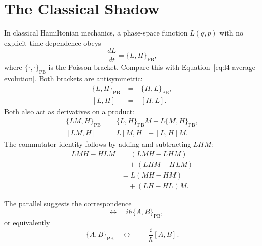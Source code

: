 \begin{classroomqa}
\end{classroomqa}

\section{The Classical Shadow}

In classical Hamiltonian mechanics, a phase-space function \(L(q,p)\) with no explicit time dependence obeys
\begin{equation}
\frac{dL}{dt}=\{L,H\}_{\mathrm{PB}},
\label{eq:l4-poisson-evolution}
\end{equation}
where \(\{\cdot,\cdot\}_{\mathrm{PB}}\) is the Poisson bracket. Compare this with Equation~\eqref{eq:l4-average-evolution}. Both brackets are antisymmetric:
\begin{align}
\{L,H\}_{\mathrm{PB}}&=-\{H,L\}_{\mathrm{PB}},\\
[L,H]&=-[H,L].
\end{align}
Both also act as derivatives on a product:
\begin{align}
\{LM,H\}_{\mathrm{PB}}
&=\{L,H\}_{\mathrm{PB}}M+L\{M,H\}_{\mathrm{PB}},\\
[LM,H]
&=L[M,H]+[L,H]M.
\label{eq:l4-commutator-product}
\end{align}
The commutator identity follows by adding and subtracting \(LHM\):
\begin{align}
LMH-HLM
&=(LMH-LHM)\\
&\quad +(LHM-HLM)\\
&=L(MH-HM)\\
&\quad +(LH-HL)M.
\end{align}

The parallel suggests the correspondence
\begin{equation}
[A,B]
\quad\longleftrightarrow\quad
i\hbar\{A,B\}_{\mathrm{PB}},
\label{eq:l4-dirac-correspondence}
\end{equation}
or equivalently
\begin{equation}
\{A,B\}_{\mathrm{PB}}
\quad\longleftrightarrow\quad
-\frac{i}{\hbar}[A,B].
\end{equation}

